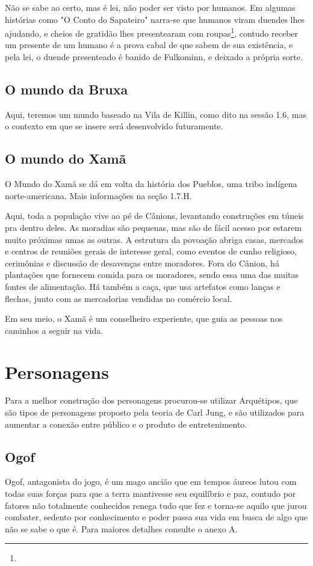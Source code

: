 Não se sabe ao certo, mas é lei, não poder ser visto por humanos. Em algumas histórias como "O Conto do Sapateiro" narra-se que humanos viram duendes lhes ajudando, e cheios de gratidão lhes presentearam com roupas\footnote{}, contudo receber um presente de um humano é a prova cabal de que sabem de sua existência, e pela lei, o duende presenteado é banido de Fulkominn, e deixado a própria sorte.

\subsection{O mundo da Bruxa}
Aqui, teremos um mundo baseado na Vila de Killin, como dito na sessão 1.6, mas o contexto em que se insere será desenvolvido futuramente.


\subsection{O mundo do Xamã}
O Mundo do Xamã se dá em volta da história dos Pueblos, uma tribo indígena norte-americana. Mais informações na seção 1.7.H.

Aqui, toda a população vive ao pé de Cânions, levantando construções em túneis pra dentro deles. As moradias são pequenas, mas são de fácil acesso por estarem muito próximas umas as outras. A estrutura da povoação abriga casas, mercados e centros de reuniões gerais de interesse geral, como eventos de cunho religioso, cerimônias e discussão de desavenças entre moradores. Fora do Cânion, há plantações que fornecem comida para os moradores, sendo essa uma das muitas fontes de alimentação. Há também a caça, que usa artefatos como lanças e flechas, junto com as mercadorias vendidas no comércio local.

Em seu meio, o Xamã é um conselheiro experiente, que guia as pessoas nos caminhos a seguir na vida.

\section{Personagens}
Para a melhor construção dos personagens procurou-se utilizar Arquétipos, que são tipos de personagens proposto pela teoria de Carl Jung, e são utilizados para aumentar a conexão entre público e o produto de entretenimento.

\subsection{Ogof}
Ogof, antagonista do jogo, é um mago ancião que em tempos áureos lutou com todas suas forças para que a terra mantivesse seu equilíbrio e paz, contudo por fatores não totalmente conhecidos renega tudo que fez e torna-se aquilo que jurou combater, sedento por conhecimento e poder passa sua vida em busca de algo que não se sabe o que é. Para maiores detalhes consulte o anexo A.

